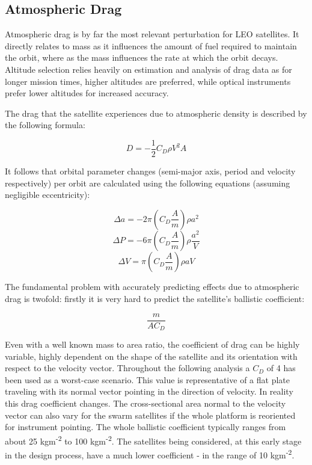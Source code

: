 \subsection{Atmospheric Drag}
\label{mtrAtmDrag}

Atmospheric drag is by far the most relevant perturbation for \ac{LEO} satellites. It directly relates to mass as it influences the amount of fuel required to maintain the orbit, where as the mass influences the rate at which the orbit decays. Altitude selection relies heavily on estimation and analysis of drag data as for longer mission times, higher altitudes are preferred, while optical instruments prefer lower altitudes for increased accuracy.

The drag that the satellite experiences due to atmospheric density is described by the following formula:

\begin{equation}
D = -\frac{1}{2} C_D \rho V^2A
\label{drag}
\end{equation}

It follows that orbital parameter changes (semi-major axis, period and velocity respectively) per orbit are calculated using the following equations (assuming negligible eccentricity):

\begin{equation}
\Delta a = -2 \pi \left( C_D \frac{A}{m} \right) \rho a^2
\label{deltaSMA}
\end{equation}
\begin{equation}
\Delta P = -6 \pi \left( C_D \frac{A}{m} \right) \rho \frac{a^2}{V}
\label{deltaP}
\end{equation}
\begin{equation}
\Delta V = \pi \left( C_D \frac{A}{m} \right) \rho aV
\label{deltaV}
\end{equation}

The fundamental problem with accurately predicting effects due to atmospheric drag is twofold: firstly it is very hard to predict the satellite's ballistic coefficient:

\begin{equation}
\frac{m}{AC_D}
\label{ball}
\end{equation}

Even with a well known mass to area ratio, the coefficient of drag can be highly variable, highly dependent on the shape of the satellite and its orientation with respect to the velocity vector. Throughout the following analysis a $C_D$ of 4 has been used as a worst-case scenario. This value is representative of a flat plate traveling with its normal vector pointing in the direction of velocity. In reality this drag coefficient changes. The cross-sectional area normal to the velocity vector can also vary for the swarm satellites if the whole platform is reoriented for instrument pointing. The whole ballistic coefficient typically ranges from about 25 kgm\textsuperscript{-2} to 100 kgm\textsuperscript{-2}. The satellites being considered, at this early stage in the design process, have a much lower coefficient - in the range of 10 kgm\textsuperscript{-2}.


